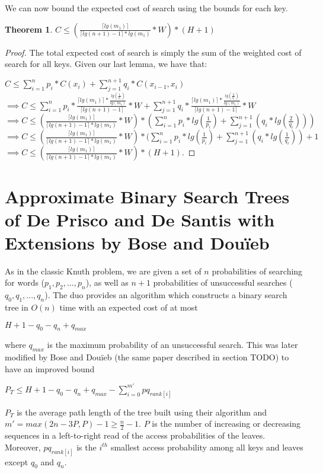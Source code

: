 \documentclass[letterpaper,12pt,titlepage,oneside,final]{book}
\theoremstyle{plain}
\newtheorem{thm}{Theorem}[section]
\begin{document}
We can now bound the expected cost of search using the bounds for each key.

\begin{thm}
$C \leq  (\frac{\lceil lg(m_1) \rceil}{\lceil lg(n+1) - 1 \rceil*lg(m_1)} * W) * (H + 1)$
\end{thm}

\begin{proof}
The total expected cost of search is simply the sum of the weighted cost of search for all keys. Given our last lemma, we have that:

$C \leq \sum_{i=1}^{n} p_i*C(x_i) + \sum_{j=1}^{n+1} q_i*C(x_{i-1},x_i)$ \\

$\implies C \leq \sum_{i=1}^{n} p_i*\frac{\lceil lg(m_1) \rceil * \frac{lg(\frac{1}{p_i})}{lg(m_1)}}{\lceil lg(n+1) - 1 \rceil} * W + \sum_{j=1}^{n+1} q_i*\frac{\lceil lg(m_1) \rceil * \frac{lg(\frac{2}{q_i})}{lg(m_1)}}{\lceil lg(n+1) - 1 \rceil} * W$ \\

$\implies C \leq  (\frac{\lceil lg(m_1) \rceil}{\lceil lg(n+1) - 1 \rceil*lg(m_1)} * W) * (\sum_{i=1}^{n} p_i*lg(\frac{1}{p_i}) + \sum_{j=1}^{n+1} (q_i*lg(\frac{2}{q_i})))$ \\

$\implies C \leq  (\frac{\lceil lg(m_1) \rceil}{\lceil lg(n+1) - 1 \rceil*lg(m_1)} * W) * (\sum_{i=1}^{n} p_i*lg(\frac{1}{p_i}) + \sum_{j=1}^{n+1} (q_i*lg(\frac{1}{q_i}))+ 1$ \\

$\implies C \leq  (\frac{\lceil lg(m_1) \rceil}{\lceil lg(n+1) - 1 \rceil*lg(m_1)} * W) * (H + 1)$.
\end{proof}


\section{Approximate Binary Search Trees of De Prisco and De Santis with Extensions by Bose and Dou\"{i}eb}

As in the classic Knuth problem, we are given a set of $n$ probabilities of searching for words ($p_1, p_2, ..., p_n$), as well as $n+1$ probabilities of unsuccessful searches ($q_0, q_1, ..., q_n$). The duo provides an algorithm which constructs a binary search tree in $O(n)$ time with an expected cost of at most \cite{de1993binary}
\begin{center}
$H+1-q_0-q_n+q_{max}$
\end{center}  where $q_{max}$ is the maximum probability of an unsuccessful search. This was later modified by Bose and Dou\"{i}eb (the same paper described in section TODO) to have an improved bound \cite{bose2009efficient}
\begin{center}
$P_T \leq H + 1 - q_0 - q_n + q_{max} - \sum_{i=0}^{m'} pq_{rank[i]}$
\end{center}
$P_T$ is the average path length of the tree built using their algorithm and $m'=max({2n-3P,P})-1 \geq \frac{n}{2} - 1$. $P$ is the number of increasing or decreasing sequences in a left-to-right read of the access probabilities of the leaves. Moreover, $pq_{rank[i]}$ is the $i^{th}$ smallest access probability among all keys and leaves except $q_0$ and $q_n$. \\
\end{document}
